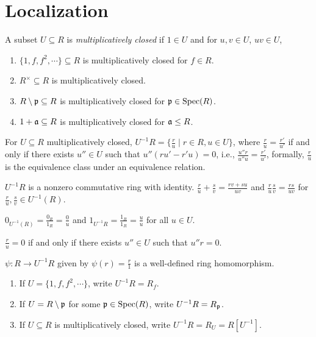 \chapter{Localization}

\begin{recall}
    A subset $U \subseteq R$ is \emph{multiplicatively closed} if $1 \in U$ and for $u,v \in U$, $uv \in U$, 
\end{recall}

\begin{example}
    \begin{enumerate}
        \item $\{1,f,f^2,\cdots\} \subseteq R$ is multiplicatively closed for $f \in R$.
        \item $R^\times \subseteq R$ is multiplicatively closed.
        \item $R \setminus \mathfrak{p} \subseteq R$ is multiplicatively closed for $\mathfrak{p} \in \operatorname{Spec}(R)$.
        \item $1 + \mathfrak{a} \subseteq R$ is multiplicatively closed for $\mathfrak{a} \leq R$.
    \end{enumerate}
\end{example}

\begin{recall} \label{defOfMultiplicativelyClosedSet}
    For $U \subseteq R$ multiplicatively closed, $U^{-1}R = \{\frac{r}{u} \mid r \in R, u \in U\}$, where $\frac{r}{u} = \frac{r'}{u'}$ if and only if there exists $u'' \in U$ such that $u''(ru'-r'u) = 0$, i.e., $\frac{u''r}{u''u} = \frac{r'}{u'}$, formally, $\frac{r}{u}$ is the equivalence class under an equivalence relation. \par 
    $U^{-1}R$ is a nonzero commutative ring with identity. $\frac{r}{u} + \frac{s}{v} = \frac{rv+su}{uv}$ and $\frac{r}{u} \frac{s}{v} = \frac{rs}{uv}$ for $\frac{r}{u},\frac{s}{v} \in U^{-1}(R)$. \par 
    $0_{U^{-1}(R)} = \frac{0_R}{1_R} = \frac{0}{u}$ and $1_{U^{-1}R} = \frac{1_{R}}{1_{R}} = \frac{u}{u}$ for all $u \in U$. \par 
    $\frac{r}{u} = 0$ if and only if there exists $u'' \in U$ such that $u''r = 0$. \par 
    $\psi: R \to U^{-1}R$ given by $\psi(r) = \frac{r}{1}$ is a well-defined ring homomorphism.
\end{recall}

\begin{notation}
    \begin{enumerate}
        \item If $U = \{1,f,f^2,\cdots\}$, write $U^{-1}R = R_f$.
        \item If $U = R \setminus \mathfrak{p}$ for some $\mathfrak{p} \in \operatorname{Spec}(R)$, write $U^{-1}R = R_{\mathfrak{p}}$.
        \item If $U \subseteq R$ is multiplicatively closed, write $U^{-1}R = R_U = R[U^{-1}]$.
    \end{enumerate}
\end{notation}

